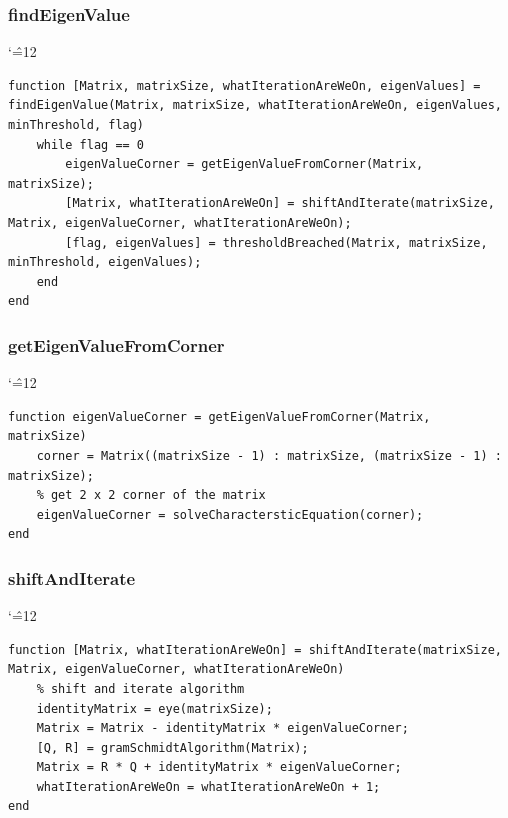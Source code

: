 \documentclass[12pt]{report}
\newenvironment{simplechar}{%
   \catcode`\^=12
}{}
\begin{document}
\subsubsection{findEigenValue}
\begin{simplechar}
\begin{lstlisting}
function [Matrix, matrixSize, whatIterationAreWeOn, eigenValues] = findEigenValue(Matrix, matrixSize, whatIterationAreWeOn, eigenValues, minThreshold, flag)
    while flag == 0
        eigenValueCorner = getEigenValueFromCorner(Matrix, matrixSize);
        [Matrix, whatIterationAreWeOn] = shiftAndIterate(matrixSize, Matrix, eigenValueCorner, whatIterationAreWeOn);
        [flag, eigenValues] = thresholdBreached(Matrix, matrixSize, minThreshold, eigenValues);
    end
end

\end{lstlisting}
\end{simplechar}

\newpage
\subsubsection{getEigenValueFromCorner}
\begin{simplechar}
\begin{lstlisting}
function eigenValueCorner = getEigenValueFromCorner(Matrix, matrixSize)
    corner = Matrix((matrixSize - 1) : matrixSize, (matrixSize - 1) : matrixSize);
    % get 2 x 2 corner of the matrix
    eigenValueCorner = solveCharactersticEquation(corner);
end

\end{lstlisting}
\end{simplechar}

\subsubsection{shiftAndIterate}
\begin{simplechar}
\begin{lstlisting}
function [Matrix, whatIterationAreWeOn] = shiftAndIterate(matrixSize, Matrix, eigenValueCorner, whatIterationAreWeOn)
    % shift and iterate algorithm
    identityMatrix = eye(matrixSize);
    Matrix = Matrix - identityMatrix * eigenValueCorner;
    [Q, R] = gramSchmidtAlgorithm(Matrix);
    Matrix = R * Q + identityMatrix * eigenValueCorner;
    whatIterationAreWeOn = whatIterationAreWeOn + 1;
end

\end{lstlisting}
\end{simplechar}
\end{document}
